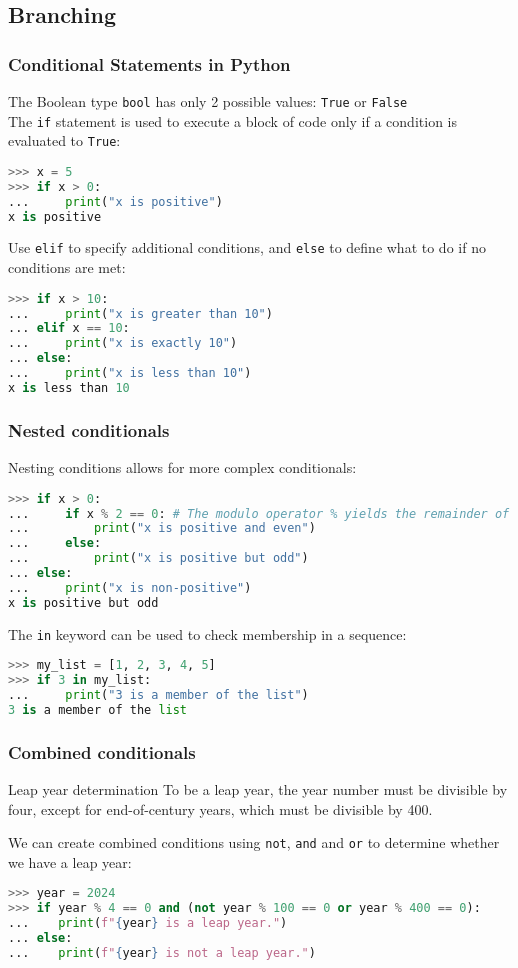 \subsection{Branching}
\begin{frame}[fragile]
  \frametitle{Conditional Statements in Python}
  The Boolean type \lstinline|bool| has only 2 possible values: \lstinline|True| or \lstinline|False| \\
  The \lstinline{if} statement is used to execute a block of code only if a condition is evaluated to \lstinline|True|:
  \begin{lstlisting}[language=Python, numbers=none, deletekeywords={is,not}]
>>> x = 5
>>> if x > 0:
...     print("x is positive")
x is positive
  \end{lstlisting}\pause
  Use \lstinline{elif} to specify additional conditions, and \lstinline{else} to define what to do if no conditions are met:
  \begin{lstlisting}[language=Python, numbers=none, deletekeywords={is,not}]
>>> if x > 10:
...     print("x is greater than 10")
... elif x == 10:
...     print("x is exactly 10")
... else:
...     print("x is less than 10")
x is less than 10
  \end{lstlisting}
\end{frame}

\begin{frame}[fragile]
  \frametitle{Nested conditionals}
  Nesting conditions allows for more complex conditionals:
  \begin{lstlisting}[language=Python, numbers=none, deletekeywords={is,not}]
>>> if x > 0:
...     if x % 2 == 0: # The modulo operator % yields the remainder of a division
...         print("x is positive and even")
...     else:
...         print("x is positive but odd")
... else:
...     print("x is non-positive")
x is positive but odd
  \end{lstlisting}\pause
  The \lstinline{in} keyword can be used to check membership in a sequence:
  \begin{lstlisting}[language=Python, numbers=none, deletekeywords={is,not}]
>>> my_list = [1, 2, 3, 4, 5]
>>> if 3 in my_list:
...     print("3 is a member of the list")
3 is a member of the list
  \end{lstlisting}
\end{frame}

\begin{frame}[fragile]
  \frametitle{Combined conditionals}
  \begin{block}{Leap year determination}
    To be a leap year, the year number must be divisible by four, except for end-of-century years, which must be divisible by 400.
  \end{block}
  We can create combined conditions using \lstinline|not|, \lstinline|and| and \lstinline|or| to determine whether we have a leap year:
  \begin{lstlisting}[language=Python, numbers=none]
>>> year = 2024
>>> if year % 4 == 0 and (not year % 100 == 0 or year % 400 == 0):
...    print(f"{year} is a leap year.")
... else:
...    print(f"{year} is not a leap year.")
  \end{lstlisting}
\end{frame}

